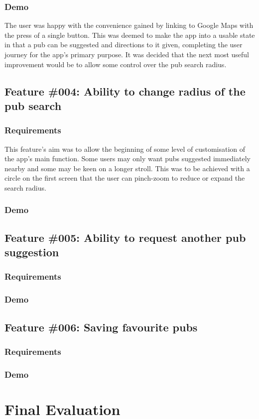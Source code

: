 \documentclass{report}
\begin{document}
\subsection{Demo}

The user was happy with the convenience gained by linking to Google Maps
with the press of a single button. This was deemed to make the app into
a usable state in that a pub can be suggested and directions to it given,
completing the user journey for the app's primary purpose. It was decided
that the next most useful improvement would be to allow some control over
the pub search radius.

\section{Feature \#004: Ability to change radius of the pub search}
\subsection{Requirements}

This feature's aim was to allow the beginning of some level of customisation
of the app's main function. Some users may only want pubs suggested
immediately nearby and some may be keen on a longer stroll. This was to be
achieved with a circle on the first screen that the user can pinch-zoom
to reduce or expand the search radius.

\subsection{Demo}



\section{Feature \#005: Ability to request another pub suggestion}
\subsection{Requirements}
\subsection{Demo}

\section{Feature \#006: Saving favourite pubs}
\subsection{Requirements}
\subsection{Demo}

\chapter{Final Evaluation}
\label{chapter:evaluation}
\end{document}
